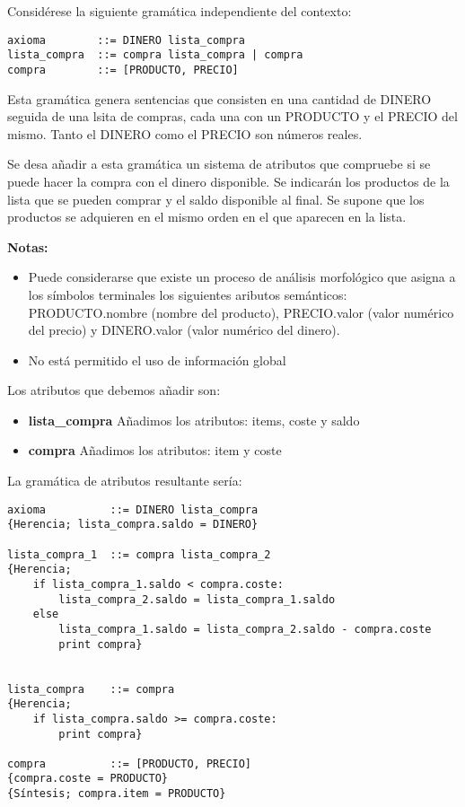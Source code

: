 \begin{problem}[4]
Considérese la siguiente gramática independiente del contexto:
\begin{verbatim}
axioma        ::= DINERO lista_compra
lista_compra  ::= compra lista_compra | compra
compra        ::= [PRODUCTO, PRECIO]
\end{verbatim}
Esta gramática genera sentencias que consisten en una cantidad de DINERO seguida de una lsita de compras, cada una con un PRODUCTO y el PRECIO del mismo. Tanto el DINERO como el PRECIO son números reales.

Se desa añadir a esta gramática un sistema de atributos que compruebe si se puede hacer la compra con el dinero disponible. Se indicarán los productos de la lista que se pueden comprar y el saldo disponible al final. Se supone que los productos se adquieren en el mismo orden en el que aparecen en la lista.

\textbf{Notas:}
\begin{itemize}
\item Puede considerarse que existe un proceso de análisis morfológico que asigna a los símbolos terminales los siguientes aributos semánticos: PRODUCTO.nombre (nombre del producto), PRECIO.valor (valor numérico del precio) y DINERO.valor (valor numérico del dinero).
\item No está permitido el uso de información global
\end{itemize}
\solution
Los atributos que debemos añadir son:
\begin{itemize}
\item \textbf{lista\_compra}
Añadimos los atributos: items, coste y saldo
\item \textbf{compra}
Añadimos los atributos: item y coste
\end{itemize}

La gramática de atributos resultante sería:
\begin{verbatim}
axioma          ::= DINERO lista_compra
{Herencia; lista_compra.saldo = DINERO}

lista_compra_1  ::= compra lista_compra_2
{Herencia;
    if lista_compra_1.saldo < compra.coste:
        lista_compra_2.saldo = lista_compra_1.saldo
    else
        lista_compra_1.saldo = lista_compra_2.saldo - compra.coste
        print compra}


lista_compra    ::= compra
{Herencia;
    if lista_compra.saldo >= compra.coste:
        print compra}

compra          ::= [PRODUCTO, PRECIO]
{compra.coste = PRODUCTO}
{Síntesis; compra.item = PRODUCTO}
\end{verbatim}
\end{problem}

